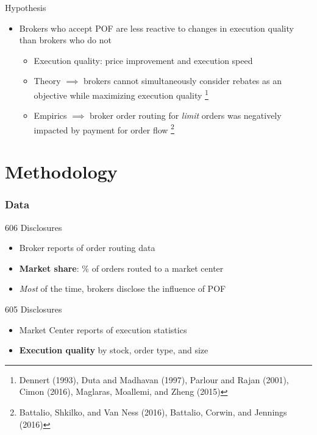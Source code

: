 \documentclass[11pt]{beamer}
\begin{document}
\begin{frame}

	\begin{block}{Hypothesis}
		\begin{itemize}
			\item Brokers who accept POF are less reactive to changes in execution quality than brokers who do not
			\begin{itemize}
				\setlength\itemsep{0.4em}
				\vspace{0.25em}
				\item Execution quality: price improvement and execution speed
				\item Theory $\implies $ brokers cannot simultaneously consider rebates as an objective while maximizing execution quality \footnote{Dennert (1993), Duta and Madhavan (1997), Parlour and Rajan (2001), Cimon (2016), Maglaras, Moallemi, and Zheng (2015)}			
				\item Empirics $\implies$ broker order routing for \textit{limit} orders was negatively impacted by payment for order flow \footnote{Battalio, Shkilko, and Van Ness (2016), Battalio, Corwin, and Jennings (2016)}
			\end{itemize}
		\end{itemize}
	\end{block}


\end{frame}


\section{Methodology}

\begin{frame}
\frametitle{Data}

\begin{block}
	{606 Disclosures}
	\begin{itemize}
		\item Broker reports of order routing data 
		\item \textbf{Market share}: \% of orders routed to a market center
		\item \textit{Most } of the time, brokers disclose the influence of POF
	\end{itemize}
\end{block}

\begin{block}
	{605 Disclosures}
	\begin{itemize}
		\item Market Center reports of execution statistics 
		\item \textbf{Execution quality} by stock, order type, and size
	\end{itemize}
\end{block}

\end{frame}
\end{document}
